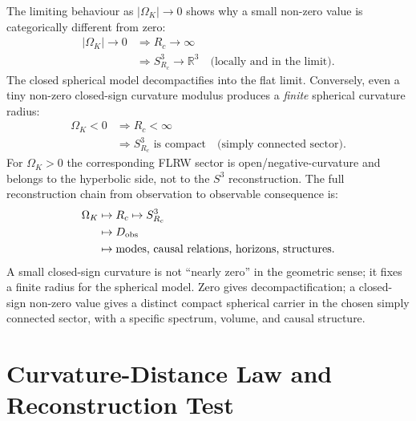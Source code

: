 \documentclass[aps,prd,onecolumn,superscriptaddress,longbibliography,nofootinbib,notitlepage]{revtex4-2}
\begin{document}
The limiting behaviour as $|\Omega_K| \to 0$ shows why a small non-zero value
is categorically different from zero:
\begin{equation}
\begin{aligned}
  |\Omega_K| \to 0
  &\Rightarrow R_c \to \infty \\
  &\Rightarrow S^3_{R_c} \to \mathbb{R}^3
  \quad\text{(locally and in the limit).}
\end{aligned}
\end{equation}
The closed spherical model decompactifies into the flat limit. Conversely, even a
tiny non-zero closed-sign curvature modulus produces a \emph{finite} spherical
curvature radius:
\begin{equation}
\begin{aligned}
  \Omega_K < 0
  &\Rightarrow R_c < \infty \\
  &\Rightarrow S^3_{R_c}\text{ is compact}
  \quad\text{(simply connected sector).}
\end{aligned}
\end{equation}
For $\Omega_K>0$ the corresponding FLRW sector is open/negative-curvature and
belongs to the hyperbolic side, not to the $S^3$ reconstruction. The full
reconstruction chain from observation to observable consequence is:
\begin{equation}
\begin{aligned}
  \Omega_K &\mapsto R_c \mapsto S^3_{R_c} \\
           &\mapsto D_{\rm obs} \\
           &\mapsto \text{modes, causal relations, horizons, structures.}
\end{aligned}
\end{equation}
A small closed-sign curvature is not ``nearly zero'' in the geometric sense; it
fixes a finite radius for the spherical model. Zero gives decompactification; a
closed-sign non-zero value gives a distinct compact spherical carrier in the
chosen simply connected sector, with a specific spectrum, volume, and causal
structure.


\section{Curvature-Distance Law and Reconstruction Test}
\label{sec:distance-law}
\end{document}
